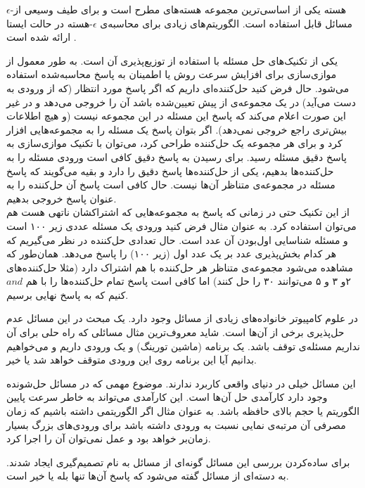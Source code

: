 $\epsilon$-هسته 
یکی از اساسی‌ترین مجموعه هسته‌های مطرح است و برای طیف وسیعی از مسائل قابل استفاده است.
الگوریتم‌های زیادی برای محاسبه‌ی $\epsilon$-هسته در حالت ایستا ارائه شده است . 

 یکی از تکنیک‌های حل مسئله با استفاده از توزیع‌پذیری آن است. به طور معمول از موازی‌سازی برای افزایش سرعت روش یا اطمینان به پاسخ محاسبه‌شده استفاده می‌شود. حال فرض کنید حل‌کننده‌ای  داریم که اگر پاسخ مورد انتظار (که از ورودی به دست می‌آید) در یک مجموعه‌ی از پیش تعیین‌شده باشد آن را خروجی می‌دهد و در غیر این صورت اعلام می‌کند که پاسخ این مسئله در این مجموعه نیست (و هیچ اطلاعات بیش‌تری راجع خروجی نمی‌دهد). اگر بتوان پاسخ یک مسئله را به مجموعه‌هایی افزار کرد و برای هر مجموعه یک حل‌کننده طراحی کرد، می‌توان با تکنیک موازی‌سازی به پاسخ دقیق مسئله رسید. برای رسیدن به پاسخ دقیق کافی است ورودی مسئله را به حل‌کننده‌ها بدهیم، یکی از حل‌کننده‌ها پاسخ دقیق را دارد و بقیه می‌گویند که پاسخ مسئله در مجموعه‌ی متناظر آن‌ها نیست. حال کافی است پاسخ آن حل‌کننده را به عنوان پاسخ خروجی بدهیم.\\
از این تکنیک حتی در زمانی که پاسخ به مجموعه‌هایی که اشتراکشان ناتهی هست هم می‌توان استفاده کرد. به عنوان مثال فرض کنید ورودی یک مسئله عددی زیر ۱۰۰ است و مسئله شناسایی اول‌بودن آن عدد است. حال تعدادی حل‌کننده در نظر می‌گیریم که هر کدام بخش‌پذیری عدد بر یک عدد اول (زیر ۱۰۰) را پاسخ می‌دهد. همان‌طور که مشاهده می‌شود مجموعه‌ی متناظر هر حل‌کننده با هم اشتراک دارد (مثلا حل‌کننده‌های ۲و ۳ و ۵ می‌توانند ۳۰ را حل کنند) اما کافی است پاسخ تمام حل‌کننده‌ها را با هم $and$ کنیم که به پاسخ نهایی برسیم.



در علوم کامپیوتر خانواده‌های زیادی از مسائل وجود دارد. یک مبحث در این مسائل عدم حل‌پذیری برخی از آن‌ها است. شاید معروف‌ترین مثال مسائلی که راه حلی برای آن نداریم مسئله‌ی توقف باشد. یک برنامه (ماشین تورینگ) و یک ورودی داریم و می‌خواهیم بدانیم آیا این برنامه روی این ورودی متوقف خواهد شد یا خیر. 

این مسائل خیلی در دنیای واقعی کاربرد ندارند. موضوع مهمی که در مسائل حل‌شونده وجود دارد کارآمدی حل آن‌ها است. این کارآمدی می‌تواند به خاطر سرعت پایین الگوریتم یا حجم بالای حافظه باشد. به عنوان مثال اگر الگوریتمی داشته باشیم که زمان مصرفی آن مرتبه‌ی نمایی نسبت به ورودی داشته باشد برای ورودی‌های بزرگ بسیار زمان‌بر خواهد بود و عمل نمی‌توان آن را اجرا کرد.

برای ساده‌کردن بررسی این مسائل گونه‌ای از مسائل به نام تصمیم‌گیری ایجاد شدند.
 به دسته‌ای از مسائل گفته می‌شود که پاسخ آن‌ها تنها بله یا خیر است.

